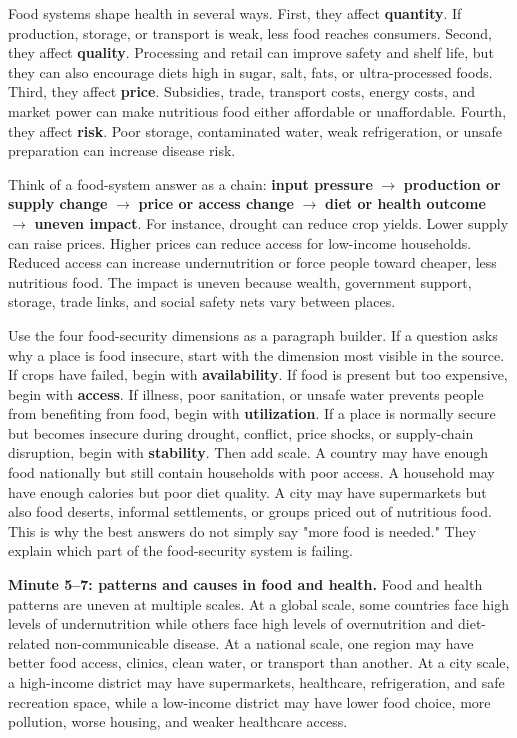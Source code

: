 \documentclass[11pt,a4paper]{article}
\newcommand{\term}[1]{\textcolor{HeadingBlue}{\textbf{#1}}}
\begin{document}
Food systems shape health in several ways. First, they affect \term{quantity}.
If production, storage, or transport is weak, less food reaches consumers.
Second, they affect \term{quality}. Processing and retail can improve safety
and shelf life, but they can also encourage diets high in sugar, salt, fats, or
ultra-processed foods. Third, they affect \term{price}. Subsidies, trade,
transport costs, energy costs, and market power can make nutritious food either
affordable or unaffordable. Fourth, they affect \term{risk}. Poor storage,
contaminated water, weak refrigeration, or unsafe preparation can increase
disease risk.

Think of a food-system answer as a chain:
\term{input pressure} $\rightarrow$ \term{production or supply change}
$\rightarrow$ \term{price or access change} $\rightarrow$ \term{diet or health
outcome} $\rightarrow$ \term{uneven impact}. For instance, drought can reduce
crop yields. Lower supply can raise prices. Higher prices can reduce access for
low-income households. Reduced access can increase undernutrition or force
people toward cheaper, less nutritious food. The impact is uneven because wealth,
government support, storage, trade links, and social safety nets vary between
places.

Use the four food-security dimensions as a paragraph builder. If a question
asks why a place is food insecure, start with the dimension most visible in the
source. If crops have failed, begin with \term{availability}. If food is present
but too expensive, begin with \term{access}. If illness, poor sanitation, or
unsafe water prevents people from benefiting from food, begin with
\term{utilization}. If a place is normally secure but becomes insecure during
drought, conflict, price shocks, or supply-chain disruption, begin with
\term{stability}. Then add scale. A country may have enough food nationally but
still contain households with poor access. A household may have enough calories
but poor diet quality. A city may have supermarkets but also food deserts,
informal settlements, or groups priced out of nutritious food. This is why the
best answers do not simply say "more food is needed." They explain which part of
the food-security system is failing.

\textbf{Minute 5--7: patterns and causes in food and health.}
Food and health patterns are uneven at multiple scales. At a global scale, some
countries face high levels of undernutrition while others face high levels of
overnutrition and diet-related non-communicable disease. At a national scale,
one region may have better food access, clinics, clean water, or transport than
another. At a city scale, a high-income district may have supermarkets,
healthcare, refrigeration, and safe recreation space, while a low-income
district may have lower food choice, more pollution, worse housing, and weaker
healthcare access.
\end{document}
